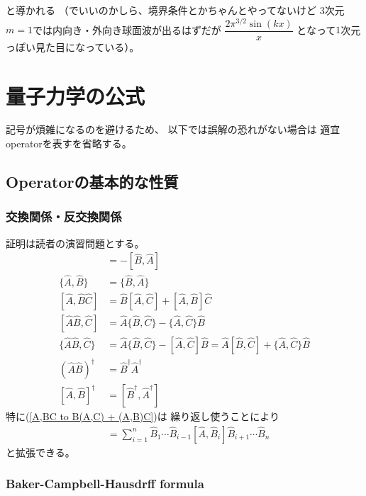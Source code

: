 と導かれる
（でいいのかしら、境界条件とかちゃんとやってないけど
$3$次元$m = 1$では内向き・外向き球面波が出るはずだが
$\dfrac{ 2 \pi^{3/2} \sin (kx) }{x}$
となって$1$次元っぽい見た目になっている）。

\newpage
\section{量子力学の公式}

記号が煩雑になるのを避けるため、
以下では誤解の恐れがない場合は
適宜operatorを表す$\hat{}$を省略する。

\subsection{Operatorの基本的な性質}

\subsubsection{交換関係・反交換関係}

証明は読者の演習問題とする。
\begin{align}
    [\hat{A}, \hat{B}] &= - [\hat{B}, \hat{A}]
\\
    \{\hat{A}, \hat{B}\} &= \{\hat{B}, \hat{A}\}
\\
    [\hat{A}, \hat{B}\hat{C}]
   &=
   \hat{B}[\hat{A}, \hat{C}]
+
    [\hat{A}, \hat{B}] \hat{C}
\label{A,BC to B(A,C) + (A,B)C}
\\
    [\hat{A}\hat{B}, \hat{C}]
   &=
   \hat{A}\{\hat{B}, \hat{C}\}
-
    \{\hat{A}, \hat{C}\} \hat{B}
\\
    \{ \hat{A}\hat{B}, \hat{C} \}
   &=
   \hat{A}\{\hat{B}, \hat{C}\}
-
    [ \hat{A}, \hat{C} ] \hat{B}
=
   \hat{A} [ \hat{B}, \hat{C} ]
+
    \{\hat{A}, \hat{C}\} \hat{B}
\\
    \left(\hat{A}\hat{B}\right)^\dagger
    &=
    \hat{B}^\dagger\hat{A}^\dagger
\\
    [\hat{A}, \hat{B}]^\dagger
    &=
    [\hat{B}^\dagger, \hat{A}^\dagger]
\end{align}
特に(\ref{A,BC to B(A,C) + (A,B)C})は
繰り返し使うことにより
\begin{align}
    [\hat{A}, \hat{B}_1\hat{B}_2\cdots\hat{B}_n]
   &=
   \sum_{i=1}^n
   \hat{B}_1\cdots\hat{B}_{i-1}
   [\hat{A}, \hat{B}_i]
   \hat{B}_{i+1}\cdots\hat{B}_n
\end{align}
と拡張できる。

\subsubsection{Baker-Campbell-Hausdrff formula}

